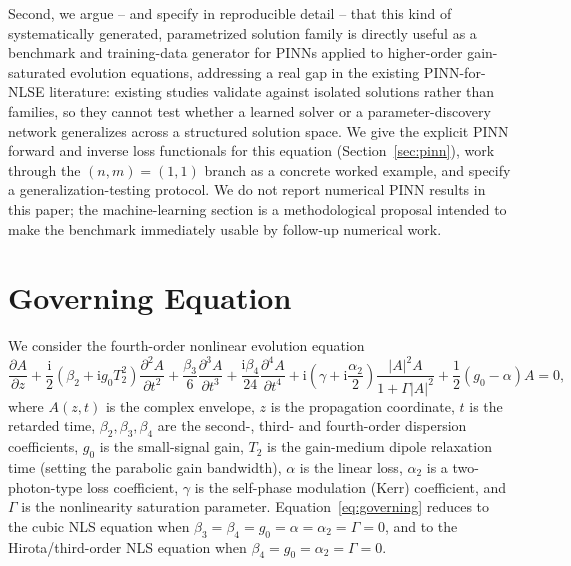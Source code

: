 \documentclass[11pt]{article}
\newcommand{\ii}{\mathrm{i}}
\begin{document}
Second, we argue -- and specify in reproducible detail -- that this kind of
systematically generated, parametrized solution family is directly useful as a
benchmark and training-data generator for PINNs applied to higher-order gain-saturated
evolution equations, addressing a real gap in the existing PINN-for-NLSE literature:
existing studies validate against isolated solutions rather than families, so they
cannot test whether a learned solver or a parameter-discovery network generalizes
across a structured solution space. We give the explicit PINN forward and inverse loss
functionals for this equation (Section~\ref{sec:pinn}), work through the $(n,m)=(1,1)$
branch as a concrete worked example, and specify a generalization-testing protocol.
We do not report numerical PINN results in this paper; the machine-learning section is
a methodological proposal intended to make the benchmark immediately usable by
follow-up numerical work.

\section{Governing Equation}

We consider the fourth-order nonlinear evolution equation
\begin{equation}
\frac{\partial A}{\partial z}
+\frac{\ii}{2}\!\left(\beta_2+\ii g_0T_2^2\right)\frac{\partial^2 A}{\partial t^2}
+\frac{\beta_3}{6}\frac{\partial^3 A}{\partial t^3}
+\frac{\ii\beta_4}{24}\frac{\partial^4 A}{\partial t^4}
+\ii\!\left(\gamma+\ii\frac{\alpha_2}{2}\right)\frac{|A|^2A}{1+\Gamma|A|^2}
+\frac{1}{2}(g_0-\alpha)A=0,
\label{eq:governing}
\end{equation}
where $A(z,t)$ is the complex envelope, $z$ is the propagation coordinate, $t$ is the
retarded time, $\beta_2,\beta_3,\beta_4$ are the second-, third- and fourth-order
dispersion coefficients, $g_0$ is the small-signal gain, $T_2$ is the gain-medium
dipole relaxation time (setting the parabolic gain bandwidth), $\alpha$ is the linear
loss, $\alpha_2$ is a two-photon-type loss coefficient, $\gamma$ is the self-phase
modulation (Kerr) coefficient, and $\Gamma$ is the nonlinearity saturation parameter.
Equation~\eqref{eq:governing} reduces to the cubic NLS equation when
$\beta_3=\beta_4=g_0=\alpha=\alpha_2=\Gamma=0$, and to the Hirota/third-order NLS
equation when $\beta_4=g_0=\alpha_2=\Gamma=0$.
\end{document}
